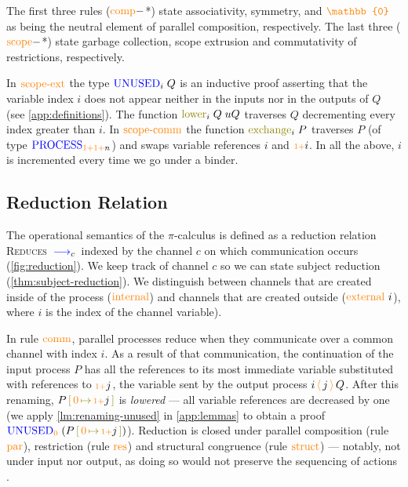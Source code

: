 \documentclass[sigplan,10pt,anonymous,review]{acmart}
\theoremstyle{definition}
\newcommand{\picalc}{$\pi$-calculus}
\newcommand{\type}[1]{\textcolor{blue}{\operatorname{#1}}}
\newcommand{\constr}[1]{\textcolor{orange}{\operatorname{#1}}}
\newcommand{\func}[1]{\textcolor{olive}{\operatorname{#1}}}
\newcommand{\PO}{\constr{\mathbb{0}}}
\newcommand{\send}[2]{#1 \, \constr{\langle} \, #2 \,\constr{\rangle} \,}
\newcommand{\suc}{\constr{\scriptstyle 1+}}
\newcommand{\subst}[3]{#1 \, \func{[} \, #3 \, \func{\mapsto} \,#2 \, \func{]}}
\newcommand{\reduce}[1]{\, \type{\longrightarrow}_{#1} \,}
\newcommand{\Process}{\type{PROCESS}}
\newcommand{\Unused}{\type{UNUSED}}
\begin{document}
The first three rules ($\constr{comp}-$*) state associativity, symmetry, and $\PO$ as being the neutral element of parallel composition, respectively.
The last three ($\constr{scope}-$*) state garbage collection, scope extrusion and commutativity of restrictions, respectively.

In $\constr{scope-ext}$ the type $\Unused_i \; Q$ is an inductive proof asserting that the variable index $i$ does not appear neither in the inputs nor in the outputs of $Q$ (see \autoref{app:definitions}).
The function $\func{lower}_i \; Q \; uQ$ traverses $Q$ decrementing every index greater than $i$.
In $\constr{scope-comm}$ the function $\func{exchange}_i \; P$ traverses $P$ (of type $\allowbreak \Process_{\suc \suc n}$) and swaps variable references $i$ and $\suc i$.
In all the above, $i$ is incremented every time we go under a binder.
  
\subsection{Reduction Relation}
\label{operational-semantics}

The operational semantics of the \picalc{} is defined as a reduction relation \textsc{Reduces} $\reduce{c}$ indexed by the channel $c$ on which communication occurs (\autoref{fig:reduction}).
We keep track of channel $c$ so we can state subject reduction (\autoref{thm:subject-reduction}).
We distinguish between channels that are created inside of the process ($\constr{internal}$) and channels that are created outside ($\constr{external}\ i$), where $i$ is the index of the channel variable).

In rule $\constr{comm}$, parallel processes reduce when they communicate over a common channel with index ${i}$.
As a result of that communication, the continuation of the input process $P$ has all the references to its most immediate variable substituted with references to $\suc j$, the variable sent by the output process $\send{i}{j}{Q}$.
After this renaming, $\subst{P}{\suc j}{\constr{0}}$ is \emph{lowered} --- all variable references are decreased by one (we apply \autoref{lm:renaming-unused} in \autoref{app:lemmas} to obtain a proof $\Unused_{\constr{0}} \; (\subst{P}{\suc j}{\constr{0}})$).
Reduction is closed under parallel composition (rule $\constr{par}$), restriction (rule $\constr{res}$) and structural congruence (rule $\constr{struct}$) 
--- notably, not under input nor output, as doing so would not preserve the sequencing of actions \cite{Sangio01}.
\end{document}
